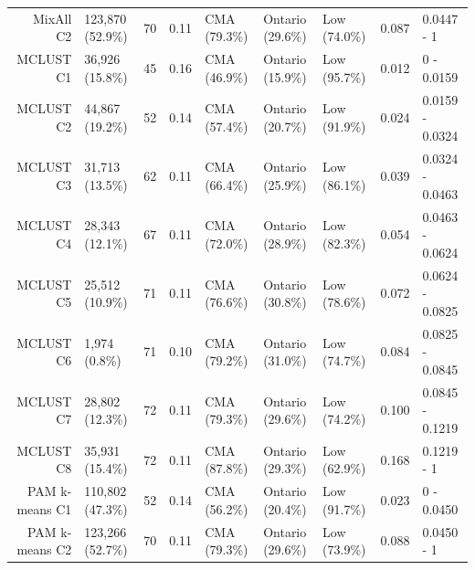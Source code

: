 \documentclass[11pt, a4paper]{article}
\begin{document}
\begin{table}[H]
{\begin{tabular}{|r|llllllll|}
  MixAll C2 & 123,870 (52.9\%) & 70 & 0.11 & CMA (79.3\%) & Ontario (29.6\%) & Low (74.0\%) & 0.087 & 0.0447 - 1 \\ 
\rowcolor{gray!25}  MCLUST C1 & 36,926 (15.8\%) & 45 & 0.16 & CMA (46.9\%) & Ontario (15.9\%) & Low (95.7\%) & 0.012 & 0 - 0.0159 \\ 
 \rowcolor{gray!25} MCLUST C2 & 44,867 (19.2\%) & 52 & 0.14 & CMA (57.4\%) & Ontario (20.7\%) & Low (91.9\%) & 0.024 & 0.0159 - 0.0324 \\ 
\rowcolor{gray!25}  MCLUST C3 & 31,713 (13.5\%) & 62 & 0.11 & CMA (66.4\%) & Ontario (25.9\%) & Low (86.1\%) & 0.039 & 0.0324 - 0.0463 \\ 
 \rowcolor{gray!25} MCLUST C4 & 28,343 (12.1\%) & 67 & 0.11 & CMA (72.0\%) & Ontario (28.9\%) & Low (82.3\%) & 0.054 & 0.0463 - 0.0624 \\ 
 \rowcolor{gray!25} MCLUST C5 & 25,512 (10.9\%) & 71 & 0.11 & CMA (76.6\%) & Ontario (30.8\%) & Low (78.6\%) & 0.072 & 0.0624 - 0.0825 \\ 
 \rowcolor{gray!25} MCLUST C6 & 1,974 (0.8\%) & 71 & 0.10 & CMA (79.2\%) & Ontario (31.0\%) & Low (74.7\%) & 0.084 & 0.0825 - 0.0845 \\ 
 \rowcolor{gray!25} MCLUST C7 & 28,802 (12.3\%) & 72 & 0.11 & CMA (79.3\%) & Ontario (29.6\%) & Low (74.2\%) & 0.100 & 0.0845 - 0.1219 \\ 
\rowcolor{gray!25}  MCLUST C8 & 35,931 (15.4\%) & 72 & 0.11 & CMA (87.8\%) & Ontario (29.3\%) & Low (62.9\%) & 0.168 & 0.1219 - 1 \\ 
  PAM k-means C1 & 110,802 (47.3\%) & 52 & 0.14 & CMA (56.2\%) & Ontario (20.4\%) & Low (91.7\%) & 0.023 & 0 - 0.0450 \\ 
  PAM k-means C2 & 123,266 (52.7\%) & 70 & 0.11 & CMA (79.3\%) & Ontario (29.6\%) & Low (73.9\%) & 0.088 & 0.0450 - 1 \\ 
   \hline
\end{tabular}
}
\end{table}
\end{document}
